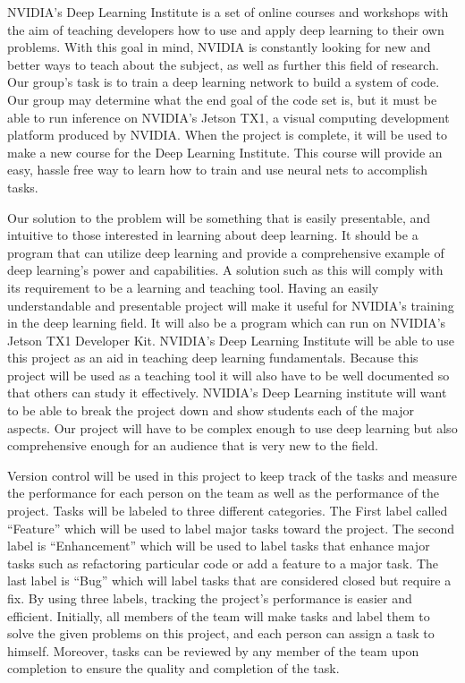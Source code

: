 \documentclass[letterpaper,10pt]{article}
\begin{document}
NVIDIA’s Deep Learning Institute is a set of online courses and workshops with the aim of teaching developers how to use and apply deep learning to their own problems.
With this goal in mind, NVIDIA is constantly looking for new and better ways to teach about the subject, as well as further this field of research.
Our group’s task is to train a deep learning network to build a system of code.
Our group may determine what the end goal of the code set is, but it must be able to run inference on NVIDIA’s Jetson TX1, a visual computing development platform produced by NVIDIA.
When the project is complete, it will be used to make a new course for the Deep Learning Institute.
This course will provide an easy, hassle free way to learn how to train and use neural nets to accomplish tasks.  

Our solution to the problem will be something that is easily presentable, and intuitive to those interested in learning about deep learning.
It should be a program that can utilize deep learning and provide a comprehensive example of deep learning's power and capabilities. A solution such as this will comply with its requirement to be a learning and teaching tool.
Having an easily understandable and presentable project will make it useful for NVIDIA's training in the deep learning field.
It will also be a program which can run on NVIDIA's Jetson TX1 Developer Kit.
NVIDIA's Deep Learning Institute will be able to use this project as an aid in teaching deep learning fundamentals.
Because this project will be used as a teaching tool it will also have to be well documented so that others can study it effectively.
NVIDIA's Deep Learning institute will want to be able to break the project down and show students each of the major aspects.
Our project will have to be complex enough to use deep learning but also comprehensive enough for an audience that is very new to the field.  

Version control will be used in this project to keep track of the tasks and measure the performance for each person on the team as well as the performance of the project.
Tasks will be labeled to three different categories.
The First label called “Feature” which will be used to label major tasks toward the project.
The second label is “Enhancement” which will be used to label tasks that enhance major tasks such as refactoring particular code or add a feature to a major task.
The last label is “Bug” which will label tasks that are considered closed but require a fix.
By using three labels, tracking the project’s performance is easier and efficient.
Initially, all members of the team will make tasks and label them to solve the given problems on this project, and each person can assign a task to himself.
Moreover, tasks can be reviewed by any member of the team upon completion to ensure the quality and completion of the task.
\end{document}
